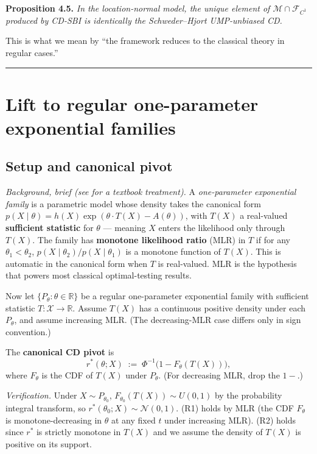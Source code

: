 \documentclass[11pt]{article}
\begin{document}
\textbf{Proposition 4.5.} \emph{In the location-normal model, the unique
element of \(\mathcal{M} \cap \mathcal{F}_{C^1}\) produced by CD-SBI is
identically the Schweder--Hjort UMP-unbiased CD.}

This is what we mean by ``the framework reduces to the classical theory
in regular cases.''

\medskip\hrule\medskip

\section{Lift to regular one-parameter exponential families}\label{sec:5}

\subsection{Setup and canonical pivot}\label{subsec:5.1}

\emph{Background, brief (see \citealp[\S3.4]{LehmannRomano2005} for a
textbook treatment).} A \emph{one-parameter exponential family} is a
parametric model whose density takes the canonical form
\(p(X \mid \theta) = h(X) \exp(\theta \cdot T(X) - A(\theta))\), with
\(T(X)\) a real-valued \textbf{sufficient statistic} for \(\theta\) ---
meaning \(X\) enters the likelihood only through \(T(X)\). The family
has \textbf{monotone likelihood ratio} (MLR) in \(T\) if for any
\(\theta_1 < \theta_2\), \(p(X \mid \theta_2)/p(X \mid \theta_1)\) is a
monotone function of \(T(X)\). This is automatic in the canonical form
when \(T\) is real-valued. MLR is the hypothesis that powers most
classical optimal-testing results.

Now let \(\{P_\theta : \theta \in \mathbb{R}\}\) be a regular
one-parameter exponential family with sufficient statistic
\(T : \mathcal{X} \to \mathbb{R}\). Assume \(T(X)\) has a continuous
positive density under each \(P_\theta\), and assume increasing MLR.
(The decreasing-MLR case differs only in sign convention.)

The \textbf{canonical CD pivot} is \[
r^*(\theta; X) \;:=\; \Phi^{-1}\bigl(1 - F_\theta(T(X))\bigr),
\] where \(F_\theta\) is the CDF of \(T(X)\) under \(P_\theta\). (For
decreasing MLR, drop the \(1 -\).)

\emph{Verification.} Under \(X \sim P_{\theta_0}\),
\(F_{\theta_0}(T(X)) \sim U(0,1)\) by the probability integral
transform, so \(r^*(\theta_0; X) \sim \mathcal{N}(0,1)\). (R1) holds by
MLR (the CDF \(F_\theta\) is monotone-decreasing in \(\theta\) at any
fixed \(t\) under increasing MLR). (R2) holds since \(r^*\) is strictly
monotone in \(T(X)\) and we assume the density of \(T(X)\) is positive
on its support.
\end{document}
